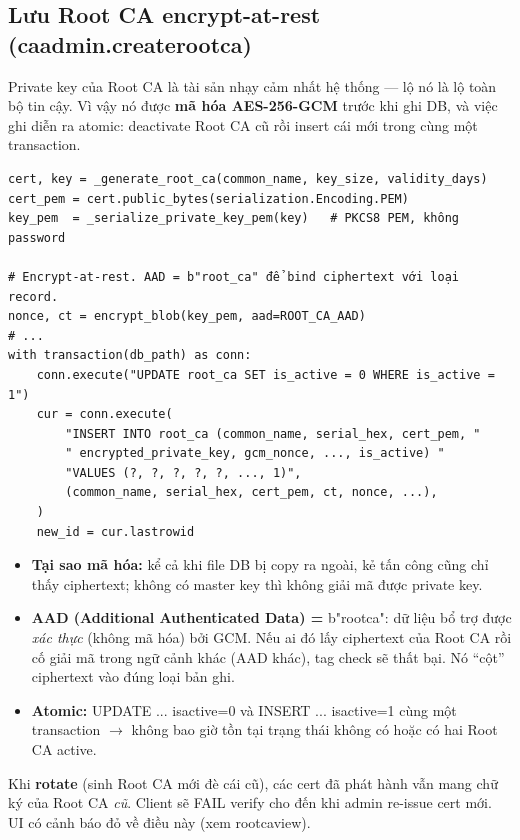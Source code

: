 \documentclass[12pt,a4paper]{article}
\newcommand{\code}[1]{{\ttfamily\small\def\_{\textunderscore\discretionary{}{}{}}#1}}
\begin{document}
\subsection{Lưu Root CA encrypt-at-rest (\code{ca\_admin.create\_root\_ca})}

Private key của Root CA là tài sản nhạy cảm nhất hệ thống — lộ nó là lộ toàn bộ
tin cậy. Vì vậy nó được \textbf{mã hóa AES-256-GCM} trước khi ghi DB, và việc
ghi diễn ra atomic: deactivate Root CA cũ rồi insert cái mới trong cùng một
transaction.

\begin{Verbatim}
cert, key = _generate_root_ca(common_name, key_size, validity_days)
cert_pem = cert.public_bytes(serialization.Encoding.PEM)
key_pem  = _serialize_private_key_pem(key)   # PKCS8 PEM, không password

# Encrypt-at-rest. AAD = b"root_ca" để bind ciphertext với loại record.
nonce, ct = encrypt_blob(key_pem, aad=ROOT_CA_AAD)
# ...
with transaction(db_path) as conn:
    conn.execute("UPDATE root_ca SET is_active = 0 WHERE is_active = 1")
    cur = conn.execute(
        "INSERT INTO root_ca (common_name, serial_hex, cert_pem, "
        " encrypted_private_key, gcm_nonce, ..., is_active) "
        "VALUES (?, ?, ?, ?, ?, ..., 1)",
        (common_name, serial_hex, cert_pem, ct, nonce, ...),
    )
    new_id = cur.lastrowid
\end{Verbatim}

\begin{itemize}
  \item \textbf{Tại sao mã hóa:} kể cả khi file DB bị copy ra ngoài, kẻ tấn công
        cũng chỉ thấy ciphertext; không có master key thì không giải mã được
        private key.
  \item \textbf{AAD (Additional Authenticated Data) =} \code{b"root\_ca"}: dữ
        liệu bổ trợ được \emph{xác thực} (không mã hóa) bởi GCM. Nếu ai đó lấy
        ciphertext của Root CA rồi cố giải mã trong ngữ cảnh khác (AAD khác),
        tag check sẽ thất bại. Nó \enquote{cột} ciphertext vào đúng loại bản ghi.
  \item \textbf{Atomic:} \code{UPDATE ... is\_active=0} và \code{INSERT ...
        is\_active=1} cùng một transaction $\to$ không bao giờ tồn tại trạng thái
        không có hoặc có hai Root CA active.
\end{itemize}

\begin{warnbox}
Khi \textbf{rotate} (sinh Root CA mới đè cái cũ), các cert đã phát hành vẫn mang
chữ ký của Root CA \emph{cũ}. Client sẽ FAIL verify cho đến khi admin re-issue
cert mới. UI có cảnh báo đỏ về điều này (xem \code{root\_ca\_view}).
\end{warnbox}
\end{document}
